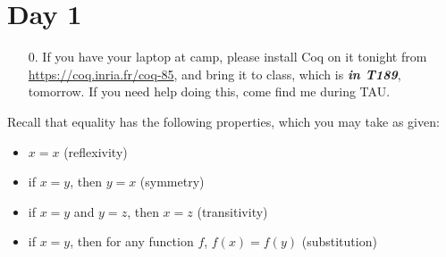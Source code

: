 \documentclass{article}
\begin{document}
\section*{Day 1}

\begin{enumerate}
  \item[0.]
    If you have your laptop at camp, please install Coq on it tonight from \url{https://coq.inria.fr/coq-85}, and bring it to class, which is \textbf{\emph{in T189}}, tomorrow.  If you need help doing this, come find me during TAU.
\end{enumerate}

\noindent Recall that equality has the following properties, which you may take as given:
\begin{itemize}
  \item $x = x$ (reflexivity)
  \item if $x = y$, then $y = x$ (symmetry)
  \item if $x = y$ and $y = z$, then $x = z$ (transitivity)
  \item if $x = y$, then for any function $f$, $f(x) = f(y)$ (substitution)
\end{itemize}
\end{document}
